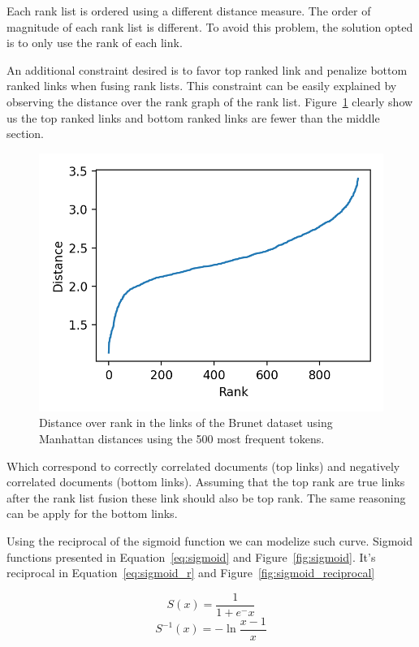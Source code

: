 Each rank list is ordered using a different distance measure.
The order of magnitude of each rank list is different.
To avoid this problem, the solution opted is to only use the rank of each link.

An additional constraint desired is to favor top ranked link and penalize bottom ranked links when fusing rank lists.
This constraint can be easily explained by observing the distance over the rank graph of the rank list.
Figure~\ref{fig:distance_over_rank} clearly show us the top ranked links and bottom ranked links are fewer than the middle section.

\begin{figure}
  \includegraphics[width=\linewidth]{img/distance_over_rank.png}
  \caption{Distance over rank in the links of the Brunet dataset using Manhattan distances using the 500 most frequent tokens.}
  \label{fig:distance_over_rank}
\end{figure}

Which correspond to correctly correlated documents (top links) and negatively correlated documents (bottom links).
Assuming that the top rank are true links after the rank list fusion these link should also be top rank.
The same reasoning can be apply for the bottom links.

Using the reciprocal of the sigmoid function we can modelize such curve. Sigmoid functions presented in Equation~\ref{eq:sigmoid} and Figure~\ref{fig:sigmoid}. It's reciprocal in Equation~\ref{eq:sigmoid_r} and Figure~\ref{fig:sigmoid_reciprocal}

\begin{equation}
  \label{eq:sigmoid}
  S(x) = \frac{1}{1+e^-x}
\end{equation}
\begin{equation}
  \label{eq:sigmoid_r}
  S^{-1}(x) = -\ln{\frac{x-1}{x}}
\end{equation}

